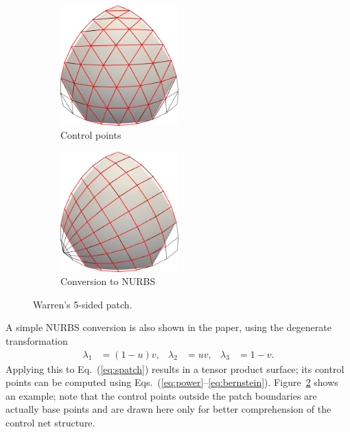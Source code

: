 \documentclass[9pt,academicons]{article}
\begin{document}
\begin{figure}
  \begin{subfigure}{0.49\textwidth}
    \centering
    \includegraphics[width = 0.5\textwidth]{images/warren-cnet.png}
    \caption{Control points}
    \label{fig:warren-cnet}
  \end{subfigure}
  \hfill
  \begin{subfigure}{0.49\textwidth}
    \centering
    \includegraphics[width = 0.5\textwidth]{images/warren-quad.png}
    \caption{Conversion to NURBS}
    \label{fig:warren-quad}
  \end{subfigure}
  \caption{Warren's 5-sided patch.}
  \label{fig:warren}
\end{figure}
A simple NURBS conversion is also shown in the paper,
using the degenerate transformation
\begin{align}
  \lambda_1&=(1-u)v, & \lambda_2&=uv, & \lambda_3&=1-v.
\end{align}
Applying this to Eq.~(\ref{eq:spatch}) results in a tensor product surface; its control points
can be computed using Eqs.~(\ref{eq:power}--\ref{eq:bernstein}).
Figure~\ref{fig:warren-quad} shows an example; note that the control points outside the
patch boundaries are actually base points and are drawn here only for better comprehension
of the control net structure.
\end{document}
